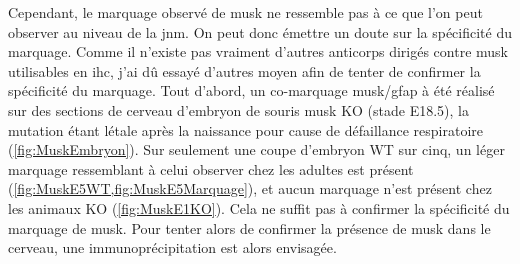 	Cependant, le marquage observé de \gls{musk} ne ressemble pas à ce que l'on peut observer au niveau de la \gls{jnm}.  On peut donc émettre un doute sur la spécificité du marquage. Comme il n'existe pas vraiment d'autres anticorps dirigés contre \gls{musk} utilisables en \gls{ihc}, j'ai dû essayé d'autres moyen afin de tenter de confirmer la spécificité du marquage. Tout d'abord, un co-marquage \gls{musk}/\acrshort{gfap} à été réalisé sur des sections de cerveau d'embryon de souris \gls{musk} KO (stade E18.5), la mutation étant létale après la naissance pour cause de défaillance respiratoire (\cref{fig:MuskEmbryon}). Sur seulement une coupe d'embryon WT sur cinq, un léger marquage ressemblant à celui observer chez les adultes est présent (\cref{fig:MuskE5WT,fig:MuskE5Marquage}), et aucun marquage n'est présent chez les animaux KO (\cref{fig:MuskE1KO}). Cela ne suffit pas à confirmer la spécificité du marquage de \gls{musk}. Pour tenter alors de confirmer la présence de \gls{musk} dans le cerveau, une immunoprécipitation est alors envisagée.
	
